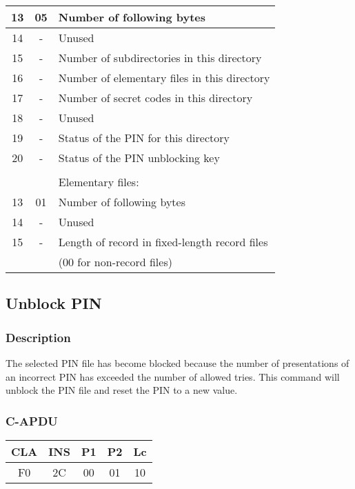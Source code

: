 \documentclass[a4paper,oneside]{article}
\begin{document}
\begin{table}[h!]
\begin{center}
\begin{tabular}{|c|c|l|}
13   &  05 &  Number of following bytes \\ \hline
14   &  -  &  Unused \\ \hline
15   &  -  &  Number of subdirectories in this directory \\ \hline
16   &  -  &  Number of elementary files in this directory \\ \hline
17   &  -  &  Number of secret codes in this directory \\ \hline
18   &  -  &  Unused \\ \hline
19   &  -  &  Status of the PIN for this directory \\ \hline
20   &  -  &  Status of the PIN unblocking key \\ \hline
     &     &  \\ \hline
     &     &  Elementary files: \\ \hline
13   &  01 &  Number of following bytes \\ \hline
14   &  -  &  Unused \\ \hline
15   &  -  &  Length of record in fixed-length record files \\
     &     &  (00 for non-record files) \\ \hline
\end{tabular}
\end{center}
\end{table}


\subsection{Unblock PIN}

\subsubsection*{Description}

The selected PIN file has become blocked because the number of
presentations of an incorrect PIN has exceeded the number of
allowed tries. This command will unblock the PIN file and
reset the PIN to a new value.

\subsubsection*{C-APDU}

\begin{tabular}{|c|c|c|c|c|} \hline
CLA & INS & P1 & P2 & Lc \\ \hline \hline
F0 & 2C & 00 & 01 & 10 \\ \hline
\end{tabular}
\end{document}
